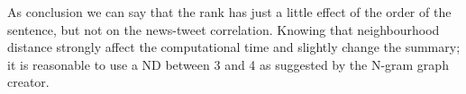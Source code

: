 As conclusion we can say that the rank has just a little effect of the order of the sentence, but not on the news-tweet correlation.
Knowing that neighbourhood distance strongly affect the computational time and slightly change the summary; it is reasonable to use a ND between 3 and 4 as suggested by the N-gram graph creator.


